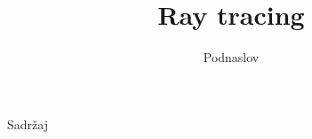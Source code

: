\documentclass[9pt]{beamer}
\title{Ray tracing}
\subtitle{Podnaslov}
\institute{Računalna grafika}
\begin{document}
\begin{frame}
 \titlepage
\end{frame}

\begin{frame}{Sadržaj}
  \tableofcontents
\end{frame}

%
%
\end{document}

